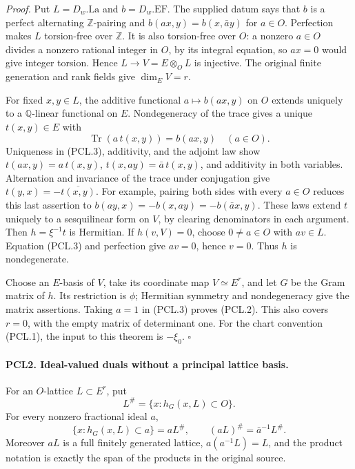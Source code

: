 \emph{Proof.}
Put \(L=D_w.\mathrm{La}\) and \(b=D_w.\mathrm{EF}\).
The supplied datum says that \(b\) is a perfect alternating
\(\mathbb Z\)-pairing and
\(b(ax,y)=b(x,\bar a y)\) for \(a\in O\).
Perfection makes \(L\) torsion-free over \(\mathbb Z\).
It is also torsion-free over \(O\): a nonzero \(a\in O\)
divides a nonzero rational integer in \(O\), by its integral
equation, so \(ax=0\) would give integer torsion.  Hence
\(L\to V=E\otimes_O L\) is injective.  The original finite
generation and rank fields give \(\dim_E V=r\).

For fixed \(x,y\in L\), the additive functional
\(a\mapsto b(ax,y)\) on \(O\) extends uniquely to a
\(\mathbb Q\)-linear functional on \(E\).  Nondegeneracy
of the trace gives a unique \(t(x,y)\in E\) with
\[
 \operatorname{Tr}(a\,t(x,y))=b(ax,y)\quad(a\in O).
                                                               \tag{PCL.3}
\]
Uniqueness in (PCL.3), additivity, and the adjoint law show
\(t(ax,y)=a\,t(x,y)\),
\(t(x,ay)=\bar a\,t(x,y)\), and additivity in both variables.
Alternation and invariance of the trace under conjugation give
\(t(y,x)=-\overline{t(x,y)}\).  For example, pairing both
sides with every \(a\in O\) reduces this last assertion to
\(b(ay,x)=-b(x,ay)=-b(\bar a x,y)\).
These laws extend \(t\) uniquely to a sesquilinear form on
\(V\), by clearing denominators in each argument.  Then
\(h=\xi^{-1}t\) is Hermitian.  If \(h(v,V)=0\), choose
\(0\ne a\in O\) with \(av\in L\).  Equation (PCL.3) and
perfection give \(av=0\), hence \(v=0\).  Thus \(h\) is
nondegenerate.

Choose an \(E\)-basis of \(V\), take its coordinate map
\(V\simeq E^r\), and let \(G\) be the Gram matrix of \(h\).
Its restriction is \(\phi\); Hermitian symmetry and
nondegeneracy give the matrix assertions.  Taking \(a=1\)
in (PCL.3) proves (PCL.2).  This also covers \(r=0\), with
the empty matrix of determinant one.  For the chart convention
(PCL.1), the input to this theorem is \(-\xi_0\).
\hfill\(\square\)

\paragraph{PCL2. Ideal-valued duals without a principal lattice basis.}
\label{claim:PCL2}
For an \(O\)-lattice \(L\subset E^r\), put
\[
 L^\#=\{x:h_G(x,L)\subset O\}.
\]
For every nonzero fractional ideal \(a\),
\[
 \{x:h_G(x,L)\subset a\}=aL^\#,
 \qquad (aL)^\#=\bar a^{-1}L^\#.                    \tag{PCL.4}
\]
Moreover \(aL\) is a full finitely generated lattice,
\(a(a^{-1}L)=L\), and the product notation is exactly the
span of the products in the original source.

